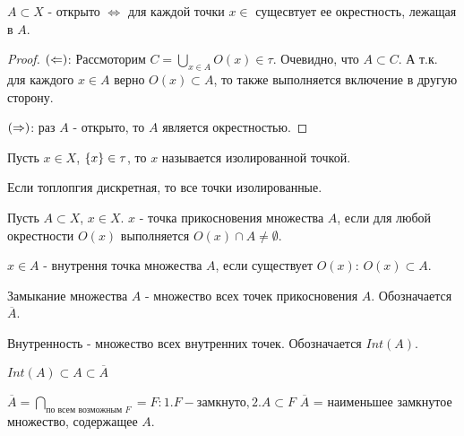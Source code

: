 \begin{statement}
    $A \subset X$ - открыто $\Leftrightarrow$ для каждой точки $x \in$ сущесвтует ее окрестность, лежащая в $A$.
\end{statement}
\begin{proof}
    
    $\left(\Leftarrow\right)$: Рассмоторим $C = \bigcup_{x \in A} O(x) \in \tau$.
    Очевидно, что $A \subset C$. А т.к. для каждого $x \in A$ верно $O(x) \subset A$, то также выполняется включение в другую сторону.

    $\left(\Rightarrow\right)$: раз $A$ - открыто, то $A$ является окрестностью.
\end{proof}

\begin{definition}
    Пусть $x \in X$, $\left\{x\right\} \in \tau$, то $x$ называется изолированной точкой.
\end{definition}

\begin{nota_bene}
    Если топлопгия дискретная, то все точки изолированные.
\end{nota_bene}

\begin{definition}
    Пусть $A \subset X$, $x \in X$. $x$ - точка прикосновения множества $A$, если для любой окрестности $O(x)$ выполняется $O(x) \cap A \neq \emptyset$. 
\end{definition}

\begin{definition}
    $x \in A$ - внутрення точка множества $A$, если существует $O(x)$: $O(x) \subset A$.
\end{definition}

\begin{definition}[A1]
    Замыкание множества $A$ - множество всех точек прикосновения $A$.
    Обозначается $\overline{A}$.
\end{definition}


\begin{definition}[B1]
    Внутренность - множество всех внутренних точек.
    Обозначается $Int(A)$.
\end{definition}

\begin{exercise}
    $Int(A) \subset A \subset \overline{A}$
\end{exercise}

\begin{definition}[A2]
    $\overline{A} = \bigcap_{\text{по всем возможным } F} = {F : 1. F - \text{замкнуто}}, 2. A \subset F$
    $\overline{A}$ = наименьшее замкнутое множество, содержащее $A$.

\end{definition}

